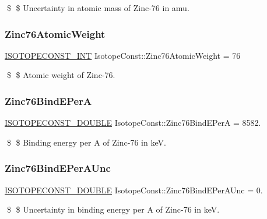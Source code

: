 \$ \$ Uncertainty in atomic mass of Zinc-\/76 in amu. \mbox{\label{group___isotope_const-_zinc-_zn76_gaf4ed81c874c729c7d3612cc1ab3ac013}} 
\subsubsection{\texorpdfstring{Zinc76\+Atomic\+Weight}{Zinc76AtomicWeight}}
{\footnotesize\ttfamily \mbox{\hyperlink{group___isotope_const-_macros_ga5f18360b3e99483a35c32d789e62621c}{I\+S\+O\+T\+O\+P\+E\+C\+O\+N\+S\+T\+\_\+\+I\+NT}} Isotope\+Const\+::\+Zinc76\+Atomic\+Weight = 76}

\$ \$ Atomic weight of Zinc-\/76. \mbox{\label{group___isotope_const-_zinc-_zn76_ga1d97d50bbaa3162adad7ca6d50aaceeb}} 
\subsubsection{\texorpdfstring{Zinc76\+Bind\+E\+PerA}{Zinc76BindEPerA}}
{\footnotesize\ttfamily \mbox{\hyperlink{group___isotope_const-_macros_ga8f45a7272ce02c0b4c65c44636ed719a}{I\+S\+O\+T\+O\+P\+E\+C\+O\+N\+S\+T\+\_\+\+D\+O\+U\+B\+LE}} Isotope\+Const\+::\+Zinc76\+Bind\+E\+PerA = 8582.}

\$ \$ Binding energy per A of Zinc-\/76 in keV. \mbox{\label{group___isotope_const-_zinc-_zn76_ga248441ba9d84a7867e3b038b83bb1dfe}} 
\subsubsection{\texorpdfstring{Zinc76\+Bind\+E\+Per\+A\+Unc}{Zinc76BindEPerAUnc}}
{\footnotesize\ttfamily \mbox{\hyperlink{group___isotope_const-_macros_ga8f45a7272ce02c0b4c65c44636ed719a}{I\+S\+O\+T\+O\+P\+E\+C\+O\+N\+S\+T\+\_\+\+D\+O\+U\+B\+LE}} Isotope\+Const\+::\+Zinc76\+Bind\+E\+Per\+A\+Unc = 0.}

\$ \$ Uncertainty in binding energy per A of Zinc-\/76 in keV. \mbox{\label{group___isotope_const-_zinc-_zn76_ga8e64d4c629603e20c42ef66274d71db2}} 
